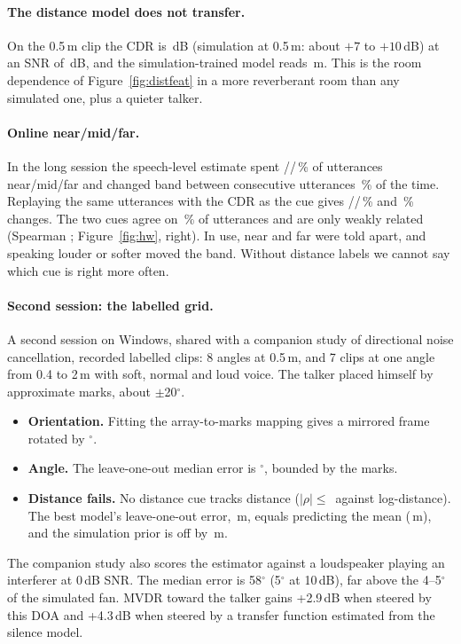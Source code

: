 \paragraph{The distance model does not transfer.} On the 0.5\,m clip the
CDR is \hwClipCdr\,dB (simulation at 0.5\,m: about $+7$ to $+10$\,dB) at an SNR
of \hwClipSnr\,dB, and the simulation-trained model reads
\hwClipModelRange\,m. This is the room dependence of
Figure~\ref{fig:distfeat} in a more reverberant room than any simulated
one, plus a quieter talker.

\paragraph{Online near/mid/far.} In the long session the speech-level
estimate spent \hwBandspeechdbNear/\hwBandspeechdbMid/\hwBandspeechdbFar\,\%
of utterances near/mid/far and changed band between consecutive utterances
\hwSwitchSpeech\,\% of the time. Replaying the same utterances with the CDR
as the cue gives \hwBandcdrdbNear/\hwBandcdrdbMid/\hwBandcdrdbFar\,\% and
\hwSwitchCdr\,\% changes. The two cues agree on \hwBandAgree\,\% of
utterances and are only weakly related (Spearman \hwRhoSpeechCdr;
Figure~\ref{fig:hw}, right). In use, near and far were told apart, and
speaking louder or softer moved the band. Without distance labels we cannot
say which cue is right more often.

\paragraph{Second session: the labelled grid.} A second session on
Windows, shared with a companion study of directional noise
cancellation, recorded \hwCalN{} labelled clips: 8 angles at 0.5\,m, and 7
clips at one angle from 0.4 to 2\,m with soft, normal and loud voice. The
talker placed himself by approximate marks, about $\pm$20$^\circ$.
\begin{itemize}
\item \textbf{Orientation.} Fitting the array-to-marks mapping gives a
  mirrored frame rotated by \hwCalOffset$^\circ$.
\item \textbf{Angle.} The leave-one-out median error is
  \hwCalLoo$^\circ$, bounded by the marks.
\item \textbf{Distance fails.} No distance cue tracks distance
  ($|\rho|\le$\,\hwCalSpearMax{} against log-distance). The best model's
  leave-one-out error, \hwCalMaeBest\,m, equals predicting the mean
  (\hwCalMaeMean\,m), and the simulation prior is off by \hwCalMaeSim\,m.
\end{itemize}
The companion study also scores the estimator against a loudspeaker
playing an interferer at 0\,dB SNR. The median error is 58$^\circ$
(5$^\circ$ at 10\,dB), far above the 4--5$^\circ$ of the simulated fan.
MVDR toward the talker gains +2.9\,dB when steered by this DOA and
+4.3\,dB when steered by a transfer function estimated from the silence
model.
